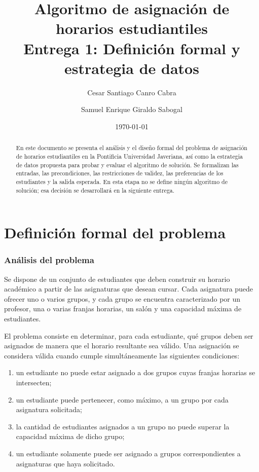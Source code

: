\documentclass[11pt]{article}
\title{Algoritmo de asignación de horarios estudiantiles\\
\large Entrega 1: Definición formal y estrategia de datos}
\author{Cesar Santiago Canro Cabra \and Samuel Enrique Giraldo Sabogal}
\date{\today}
\numberwithin{equation}{section}
\numberwithin{figure}{section}
\numberwithin{table}{section}
\theoremstyle{definition}
\begin{document}

\maketitle

\begin{abstract}
En este documento se presenta el análisis y el diseño formal del problema de
asignación de horarios estudiantiles en la Pontificia Universidad Javeriana,
así como la estrategia de datos propuesta para probar y evaluar el algoritmo
de solución. Se formalizan las entradas, las precondiciones, las restricciones
de validez, las preferencias de los estudiantes y la salida esperada. En esta
etapa no se define ningún algoritmo de solución; esa decisión se desarrollará
en la siguiente entrega.
\end{abstract}

\tableofcontents
\newpage

\part{Definición formal del problema}

\section{Análisis del problema}

Se dispone de un conjunto de estudiantes que deben construir su horario
académico a partir de las asignaturas que desean cursar. Cada asignatura puede
ofrecer uno o varios grupos, y cada grupo se encuentra caracterizado por un
profesor, una o varias franjas horarias, un salón y una capacidad máxima de
estudiantes.

El problema consiste en determinar, para cada estudiante, qué grupos deben ser
asignados de manera que el horario resultante sea válido. Una asignación se
considera válida cuando cumple simultáneamente las siguientes condiciones:

\begin{enumerate}
  \item un estudiante no puede estar asignado a dos grupos cuyas franjas
        horarias se intersecten;
  \item un estudiante puede pertenecer, como máximo, a un grupo por cada
        asignatura solicitada;
  \item la cantidad de estudiantes asignados a un grupo no puede superar la
        capacidad máxima de dicho grupo;
  \item un estudiante solamente puede ser asignado a grupos correspondientes
        a asignaturas que haya solicitado.
\end{enumerate}
\end{document}
